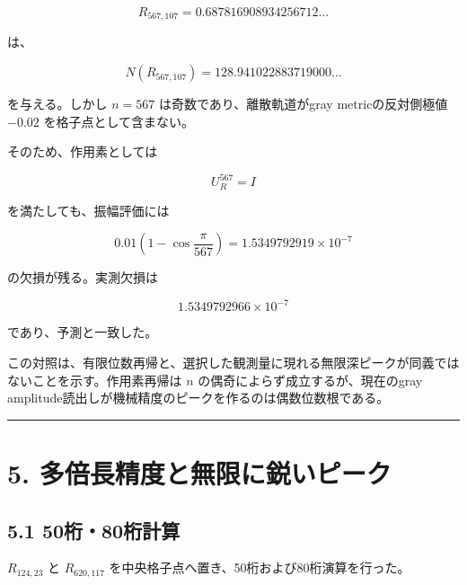 \documentclass[
  10pt,
  a4paper,
]{article}
\begin{document}
\[
R_{567,107}
=0.687816908934256712\ldots
\]

は、

\[
N(R_{567,107})
=128.941022883719000\ldots
\]

を与える。しかし \(n=567\) は奇数であり、離散軌道がgray
metricの反対側極値 \(-0.02\) を格子点として含まない。

そのため、作用素としては

\[
U_R^{567}=I
\]

を満たしても、振幅評価には

\[
0.01\left(1-\cos\frac{\pi}{567}\right)
=1.5349792919\times10^{-7}
\]

の欠損が残る。実測欠損は

\[
1.5349792966\times10^{-7}
\]

であり、予測と一致した。

この対照は、有限位数再帰と、選択した観測量に現れる無限深ピークが同義ではないことを示す。作用素再帰は
\(n\) の偶奇によらず成立するが、現在のgray
amplitude読出しが機械精度のピークを作るのは偶数位数根である。

\begin{center}\rule{0.5\linewidth}{0.5pt}\end{center}

\section{5.
多倍長精度と無限に鋭いピーク}\label{ux591aux500dux9577ux7cbeux5ea6ux3068ux7121ux9650ux306bux92edux3044ux30d4ux30fcux30af}

\subsection{5.1 50桁・80桁計算}\label{ux684180ux6841ux8a08ux7b97}

\(R_{124,23}\) と \(R_{620,117}\)
を中央格子点へ置き、50桁および80桁演算を行った。
\end{document}
